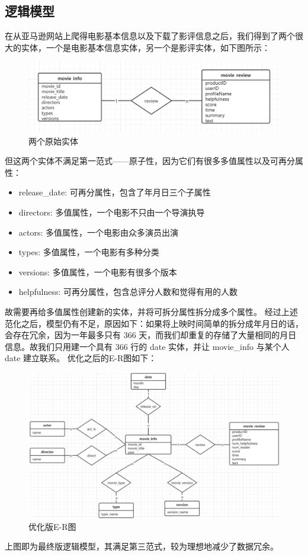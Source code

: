 \documentclass{ctexrep}
\begin{document}
	\subsection{逻辑模型}
	在从亚马逊网站上爬得电影基本信息以及下载了影评信息之后，我们得到了两个很大的实体，一个是电影基本信息实体，另一个是影评实体，如下图所示：
	\begin{figure}[H]
		\centering
		\includegraphics[width=0.7\linewidth]{img/MySQL_ER1.png}
		\caption{两个原始实体}
		\label{fig:MySQL_ER1}
	\end{figure}
	但这两个实体不满足第一范式——原子性，因为它们有很多多值属性以及可再分属性：
	\begin{itemize}
        \item release\_date: 可再分属性，包含了年月日三个子属性
        \item directors: 多值属性，一个电影不只由一个导演执导
        \item actors: 多值属性，一个电影由众多演员出演
        \item types: 多值属性，一个电影有多种分类
        \item versions: 多值属性，一个电影有很多个版本
        \item helpfulness: 可再分属性，包含总评分人数和觉得有用的人数
    \end{itemize}
    故需要再给多值属性创建新的实体，并将可拆分属性拆分成多个属性。
    经过上述范化之后，模型仍有不足，原因如下：如果将上映时间简单的拆分成年月日的话，会存在冗余，因为一年最多只有 366 天，而我们却重复的存储了大量相同的月日信息。故我们只用建一个具有 366 行的 date 实体，并让 movie\_info 与某个人 date 建立联系。
    优化之后的E-R图如下：
    \begin{figure}[H]
		\centering
		\includegraphics[width=0.7\linewidth]{img/MySQL_ER2.png}
		\caption{优化版E-R图}
		\label{fig:MySQL_ER2}
	\end{figure}
	上图即为最终版逻辑模型，其满足第三范式，较为理想地减少了数据冗余。
\end{document}
